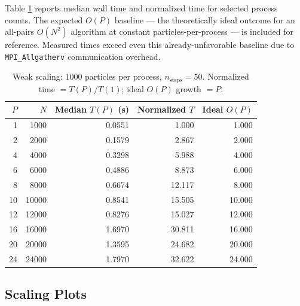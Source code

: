 \documentclass[11pt]{article}
\begin{document}
Table \ref{tab:weak} reports median wall time and normalized time for selected process counts. The expected $O(P)$ baseline — the theoretically ideal outcome for an all-pairs $O(N^2)$ algorithm at constant particles-per-process — is included for reference. Measured times exceed even this already-unfavorable baseline due to \texttt{MPI\_Allgatherv} communication overhead.

\begin{table}[H]
  \centering
  \caption{Weak scaling: 1000 particles per process, $n_\text{steps} = 50$. Normalized time $= T(P)/T(1)$; ideal $O(P)$ growth $= P$.}
  \label{tab:weak}
  \begin{tabular}{r r r r r}
    \toprule
    $P$ & $N$ & Median $T(P)$ (s) & Normalized $T$ & Ideal $O(P)$ \\
    \midrule
    1  &  1000 & 0.0551 &  1.000 &  1.000 \\
    2  &  2000 & 0.1579 &  2.867 &  2.000 \\
    4  &  4000 & 0.3298 &  5.988 &  4.000 \\
    6  &  6000 & 0.4886 &  8.873 &  6.000 \\
    8  &  8000 & 0.6674 & 12.117 &  8.000 \\
    10 & 10000 & 0.8541 & 15.505 & 10.000 \\
    12 & 12000 & 0.8276 & 15.027 & 12.000 \\
    16 & 16000 & 1.6970 & 30.811 & 16.000 \\
    20 & 20000 & 1.3595 & 24.682 & 20.000 \\
    24 & 24000 & 1.7970 & 32.622 & 24.000 \\
    \bottomrule
  \end{tabular}
\end{table}

\subsection{Scaling Plots}
\end{document}
